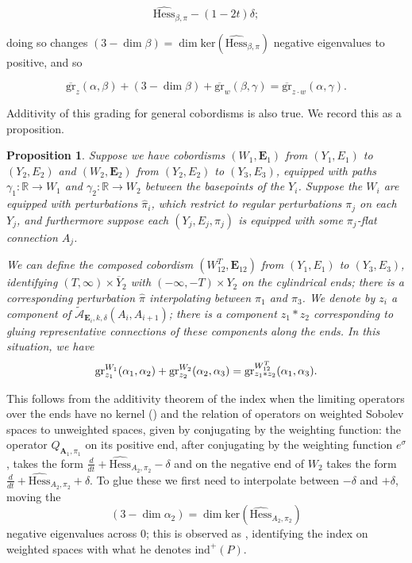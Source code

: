 \documentclass[10pt,a4paper]{amsart}
\newtheorem{proposition}[theorem]{Proposition}
\theoremstyle{definition}
\theoremstyle{remark}
\numberwithin{figure}{qchap}
\begin{document}
$$\widehat{\text{Hess}}_{\beta,\pi} - (1-2t)\delta;$$ 

doing so changes $(3-\dim \beta) = \dim \text{ker}\left(\widehat{\text{Hess}}_{\beta, \pi}\right)$ negative eigenvalues to positive, and so

$$\overline{\text{gr}}_z(\alpha, \beta)  +(3-\dim \beta) + \overline{\text{gr}}_w(\beta, \gamma) = \overline{\text{gr}}_{z \cdot w}(\alpha, \gamma).$$

Additivity of this grading for general cobordisms is also true. We record this as a proposition.

\begin{proposition}\label{gr-add}Suppose we have cobordisms $(W_1, \mathbf{E}_1)$ from $(Y_1, E_1)$ to $(Y_2, E_2)$ and $(W_2, \mathbf{E}_2)$ from $(Y_2, E_2)$ to $(Y_3, E_3)$, equipped with paths $\gamma_1: \mathbb R \to W_1$ and $\gamma_2: \mathbb R \to W_2$ between the basepoints of the $Y_i$. Suppose the $W_i$ are equipped with perturbations $\hat \pi_i$, which restrict to regular perturbations $\pi_j$ on each $Y_j$, and furthermore suppose each $(Y_j, E_j, \pi_j)$ is equipped with some $\pi_j$-flat connection $A_j$. 

We can define the composed cobordism $(W^T_{12}, \mathbf{E}_{12})$ from $(Y_1, E_1)$ to $(Y_3, E_3)$, identifying $(T, \infty) \times \overline Y_2$ with $(-\infty, -T) \times Y_2$ on the cylindrical ends; there is a corresponding perturbation $\hat \pi$ interpolating between $\pi_1$ and $\pi_3$. We denote by $z_i$ a component of $\widetilde{\mathcal A}_{\mathbf{E}_i, k, \delta}(A_i, A_{i+1})$; there is a component $z_1 \ast z_2$ corresponding to gluing representative connections of these components along the ends. In this situation, we have $$\textup{gr}^{W_1}_{z_1}(\alpha_1, \alpha_2) + \textup{gr}^{W_2}_{z_2}(\alpha_2, \alpha_3) = \textup{gr}^{W^T_{12}}_{z_1\ast z_2}(\alpha_1, \alpha_3).$$ 
\end{proposition}

This follows from the additivity theorem of the index when the limiting operators over the ends have no kernel (\cite[Proposition~3.9]{Don}) and the relation of operators on weighted Sobolev spaces to unweighted spaces, given by conjugating by the weighting function: the operator $Q_{\mathbf{A}_1, \pi_1}$ on its positive end, after conjugating by the weighting function $e^\sigma$, takes the form $\frac{d}{dt} + \widehat{\text{Hess}}_{A_2,\pi_2} - \delta$ and on the negative end of $W_2$ takes the form $\frac{d}{dt} + \widehat{\text{Hess}}_{A_2, \pi_2} + \delta$. To glue these we first need to interpolate between $-\delta$ and $+\delta$, moving the 
$$(3-\dim \alpha_2) = \dim \text{ker}\left(\widehat{\text{Hess}}_{A_2,\pi_2}\right)$$ 
negative eigenvalues across $0$; this is observed as \cite[Proposition~3.10]{Don}, identifying the index on weighted spaces with what he denotes $\text{ind}^+(P)$.
\end{document}
